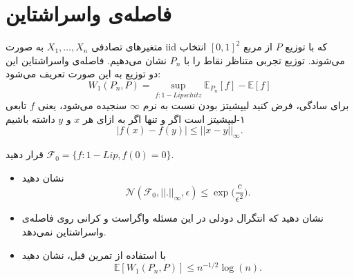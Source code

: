 

\section{فاصله‌ی واسراشتاین}
متغیر‌های تصادفی 
$X_1, \dots, X_n$
به صورت iid که با توزیع $P$ از مربع
$[0,1]^2$
انتخاب می‌شوند. توزیع تجربی متناظر نقاط را با 
$P_n$
نشان می‌دهیم. فاصله‌ی واسراشتاین این دو توزیع به این صورت تعریف می‌شود:
$$W_1(P_n,P) = \sup_{f: 1-Lipschitz} \mathbb{E}_{P_n}[f] - \mathbb{E}[f]$$
برای سادگی، فرض کنید لیپشیتز بودن نسبت به نرم 
$\infty$
سنجیده می‌شود، یعنی $f$ تابعی ۱-لیپشیتز است اگر و تنها اگر به ازای هر $x$ و $y$ داشته باشیم
$$|f(x) - f(y)| \leq ||x-y||_\infty.$$

قرار دهید
$\mathcal{F}_0 = \{f: 1-Lip, f(0) = 0\}$.

\begin{itemize}
	\item 
	نشان دهید
	$$\mathcal{N}(\mathcal{F}_0, ||.||_\infty, \epsilon) \leq \exp\big(\frac{c}{\epsilon^2}\big).$$
	
	\item 
	نشان دهید که انتگرال دودلی در این مسئله‌ واگراست و کرانی روی فاصله‌ی واسراشتاین نمی‌دهد.
	\item
	با استفاده از تمرین قبل، نشان دهید
	$$\mathbb{E}[W_1(P_n, P)] \leq n^{-1/2} \log(n). $$
\end{itemize}
